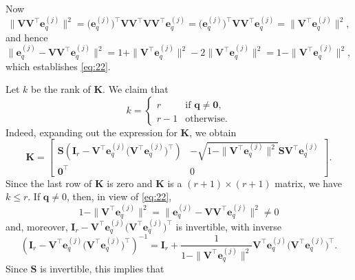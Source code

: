 \documentclass[11pt,a4paper]{article}
\theoremstyle{break}
\numberwithin{dummy}{section}
\theoremstyle{plain}
\theoremstyle{plain}
\theoremstyle{plain}
\theoremstyle{plain}
\theoremstyle{plain}
\theoremstyle{MyNonumberplain}
\newcommand{\0}{\M{0}}
\newcommand{\M}[1]{\mathbf{#1}}
\newcommand{\T}{\top}
\newcommand{\ve}[1]{\mathbf{#1}}
\newcommand{\eve}[2]{\mathbf{e}^{(#1)}_{#2}}
\begin{document}
Now
\begin{displaymath}
  \| \M{V} \M{V}^\T \eve{j}{q}\|^2
  =
  \big(\eve{j}{q}\big)^\T \M{V} \M{V}^\T \M{V} \M{V}^\T \eve{j}{q}
  =
  \big(\eve{j}{q}\big)^\T \M{V} \M{V}^\T \eve{j}{q}
  =
  \| \M{V}^\T \eve{j}{q} \|^2,
\end{displaymath}
and hence
\begin{displaymath}
  \| \eve{j}{q} - \M{V} \M{V}^\T \eve{j}{q}\|^2
  =
  1 + \| \M{V}^\T \eve{j}{q} \|^2 - 2 \| \M{V}^\T \eve{j}{q} \|^2
  =
  1 -  \| \M{V}^\T \eve{j}{q} \|^2,
\end{displaymath}
which establishes \eqref{eq:22}.

Let $k$ be the rank of $\M{K}$.  We claim that
\begin{equation}
  \label{eq:23}
  k =
  \begin{cases}
    r  & \text{if $\ve{q} \neq \0$},
    \\
    r -1 & \text{otherwise}.
  \end{cases}
\end{equation}
Indeed, expanding out the expression for $\M{K}$, we obtain
\begin{equation}
  \label{eq:24}
  \M{K}
  =
  \begin{bmatrix}
    \M{S}
    \left(
      \M{I}_r -  \M{V}^\T \eve{j}{q} \big(\M{V}^\T \eve{j}{q} \big)^\T
    \right)
    &
    - \sqrt{1 - \| \M{V}^\T \eve{j}{q} \|^2} \M{S}  \M{V}^\T \eve{j}{q} 
    \\
    \0^\T & 0 
  \end{bmatrix}.
\end{equation}
Since the last row of $\M{K}$ is zero and $\M{K}$ is a $(r+1) \times (r+1)$ matrix, we have $k \leq r$. If $\ve{q} \neq 0$, then, in view of \eqref{eq:22},
\begin{displaymath}
   1 - \| \M{V}^\T \eve{j}{q} \|^2
  =
  \| \eve{j}{q} - \M{V} \M{V}^\T \eve{j}{q}\|^2
  \neq 0
\end{displaymath}
and, moreover,
\begin{math}
  \M{I}_r -  \M{V}^\T \eve{j}{q} \big(\M{V}^\T \eve{j}{q} \big)^\T
\end{math}
is invertible, with inverse
\begin{displaymath}
  \left(
    \M{I}_r -  \M{V}^\T \eve{j}{q} \big(\M{V}^\T \eve{j}{q} \big)^\T
  \right)^{-1}
  =
  \M{I}_r
  +
  \frac{1}{1 - \| \M{V}^\T \eve{j}{q} \|^2}
  \M{V}^\T \eve{j}{q} \big(\M{V}^\T \eve{j}{q} \big)^\T.
\end{displaymath}
Since $\M{S}$ is invertible, this implies that
\end{document}
